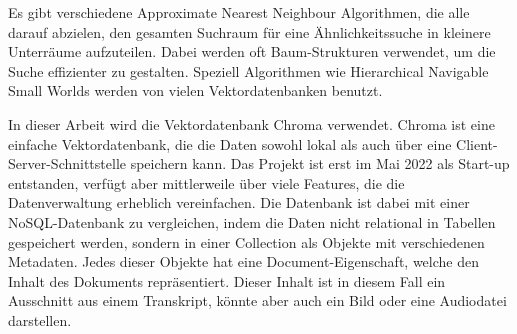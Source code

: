 Es gibt verschiedene Approximate Nearest Neighbour Algorithmen, die alle darauf abzielen, den gesamten Suchraum für eine Ähnlichkeitssuche in kleinere Unterräume aufzuteilen.
Dabei werden oft Baum-Strukturen verwendet, um die Suche effizienter zu gestalten.
Speziell Algorithmen wie Hierarchical Navigable Small Worlds werden von vielen Vektordatenbanken benutzt.








In dieser Arbeit wird die Vektordatenbank Chroma verwendet. 
Chroma ist eine einfache Vektordatenbank, die die Daten sowohl lokal als auch über eine Client-Server-Schnittstelle speichern kann.
Das Projekt ist erst im Mai 2022 als Start-up entstanden, verfügt aber mittlerweile über viele Features, die die Datenverwaltung erheblich vereinfachen.
Die Datenbank ist dabei mit einer NoSQL-Datenbank zu vergleichen, indem die Daten nicht relational in Tabellen gespeichert werden, sondern in einer Collection als Objekte mit verschiedenen Metadaten.
Jedes dieser Objekte hat eine Document-Eigenschaft, welche den Inhalt des Dokuments repräsentiert.
Dieser Inhalt ist in diesem Fall ein Ausschnitt aus einem Transkript, könnte aber auch ein Bild oder eine Audiodatei darstellen.

